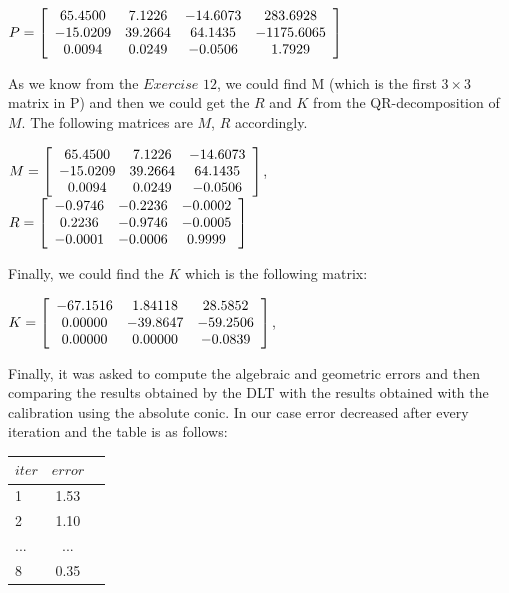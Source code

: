 \documentclass[]{article}
\begin{document}
\vspace{0.5em}

\centerline {
	$ P =\left[ {\begin{array}{*{20}c}
		65.4500 & 7.1226 & -14.6073 & 283.6928 \\
		-15.0209 & 39.2664 & 64.1435 & -1175.6065 \\
		0.0094 & 0.0249 & -0.0506 & 1.7929   
		\end{array} } \right] $
}

\vspace{0.5em}

As we know from the $Exercise$ $12$, we could find M (which is the first $3 \times 3$ matrix in P) and then we could get the $R$ and $K$ from the QR-decomposition of $M$. The following matrices are $M$, $R$ accordingly. 

\vspace{0.5em}

 \centerline {
 	$ M =\left[ {\begin{array}{*{20}c}
 		65.4500 & 7.1226 & -14.6073  \\
 		-15.0209 & 39.2664 & 64.1435  \\
 		 0.0094 & 0.0249 & -0.0506    
 		\end{array} } \right] $, $ R =\left[ {\begin{array}{*{20}c}
 		-0.9746 & -0.2236 & -0.0002  \\
 		0.2236 & -0.9746 & -0.0005  \\
 		-0.0001 & -0.0006 & 0.9999    
 		\end{array} } \right] $
 }

\vspace{0.5em}

Finally, we could find the $K$ which is the following matrix: 

\vspace{0.5em}

\centerline {
	$ K =\left[ {\begin{array}{*{20}c}
		-67.1516 & 1.84118 & 28.5852  \\
		0.00000 & -39.8647 & -59.2506  \\
		0.00000 & 0.00000 & -0.0839    
		\end{array} } \right] $,
}

\vspace{0.5em}

Finally, it was asked to compute the algebraic and geometric errors and then comparing the results obtained by the DLT with the results obtained with the calibration using the absolute conic. In our case error decreased after every iteration and the table is as follows:

\begin{table}[h!]
	\begin{center}
		\label{tab:table1}
		\begin{tabular}{l|c|r} 
			$iter$ & $error$ \\
			\hline
			1 & 1.53 \\
			2 & 1.10 \\
			... & ... \\
			8 & 0.35 \\
		\end{tabular}
	\end{center}
\end{table}
\end{document}
